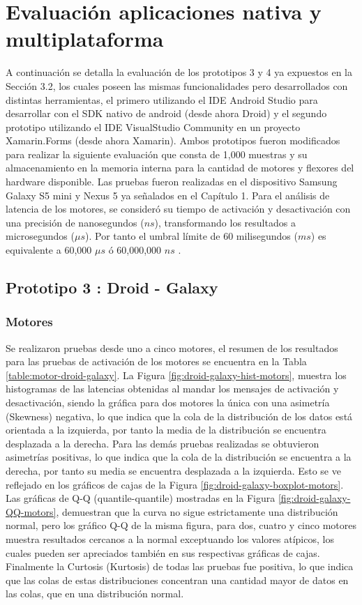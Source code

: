 \section{Evaluación aplicaciones nativa y multiplataforma}

A continuación se detalla la evaluación de los prototipos 3 y 4 ya expuestos en la Sección 3.2, los cuales poseen las mismas funcionalidades pero desarrollados con distintas herramientas, el primero utilizando el IDE Android Studio para desarrollar con el SDK nativo de android (desde ahora Droid) y el segundo prototipo utilizando el IDE VisualStudio Community en un proyecto Xamarin.Forms (desde ahora Xamarin). Ambos prototipos fueron modificados para realizar la siguiente evaluación que consta de 1,000 muestras y su almacenamiento en la memoria interna para la cantidad de motores y flexores del hardware disponible. Las pruebas fueron realizadas en el dispositivo Samsung Galaxy S5 mini y Nexus 5 ya señalados en el Capítulo 1. Para el análisis de latencia de los motores, se consideró su tiempo de activación y desactivación con una precisión de nanosegundos ($ns$), transformando los resultados a microsegundos ($\mu s$).  Por tanto el umbral límite de 60 milisegundos ($ms$) es equivalente a 60,000 $\mu s$ ó 60,000,000 $ns$ .

\subsection{Prototipo 3 : Droid - Galaxy}

\subsubsection{Motores}

Se realizaron pruebas desde uno a cinco motores, el resumen de los resultados para las pruebas de activación de los motores se encuentra en la Tabla \ref{table:motor-droid-galaxy}. La Figura \ref{fig:droid-galaxy-hist-motors}, muestra los histogramas de las latencias obtenidas al mandar los mensajes de activación y desactivación, siendo la gráfica para dos motores la única con una asimetría (Skewness) negativa, lo que indica que la cola de la distribución de los datos está orientada a la izquierda, por tanto la media de la distribución se encuentra desplazada a la derecha. Para las demás pruebas realizadas se obtuvieron asimetrías positivas, lo que indica que la cola de la distribución se encuentra a la derecha, por tanto su media se encuentra desplazada a la izquierda. Esto se ve reflejado en los gráficos de cajas de la Figura \ref{fig:droid-galaxy-boxplot-motors}. Las gráficas de Q-Q (quantile-quantile) mostradas en la Figura \ref{fig:droid-galaxy-QQ-motors}, demuestran que la curva no sigue estrictamente una distribución normal, pero los gráfico Q-Q de la misma figura, para dos, cuatro y cinco motores muestra resultados cercanos a la normal exceptuando los valores atípicos, los cuales pueden ser apreciados también en sus respectivas gráficas de cajas. Finalmente la Curtosis (Kurtosis) de todas las pruebas fue positiva, lo que indica que las colas de estas distribuciones concentran una cantidad mayor de datos en las colas, que en una distribución normal.

